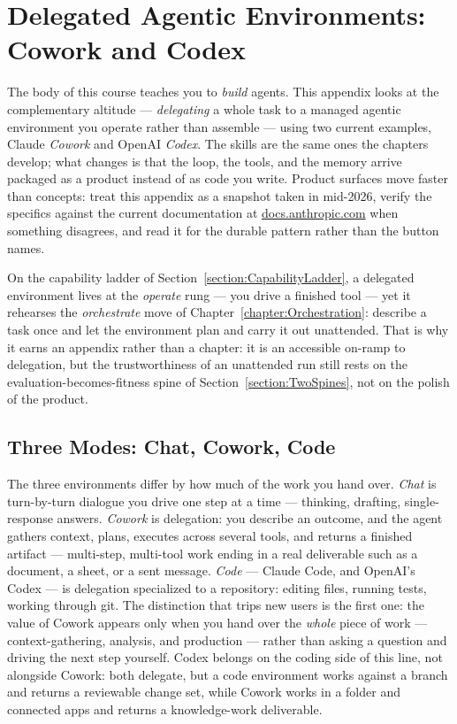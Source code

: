 \chapter{Delegated Agentic Environments: Cowork and Codex}
\label{chapter:CoworkReference}

The body of this course teaches you to \emph{build} agents.
This appendix looks at the complementary altitude --- \emph{delegating} a whole task to a managed agentic environment you operate rather than assemble --- using two current examples, Claude \emph{Cowork} and OpenAI \emph{Codex}.
The skills are the same ones the chapters develop; what changes is that the loop, the tools, and the memory arrive packaged as a product instead of as code you write.
Product surfaces move faster than concepts: treat this appendix as a snapshot taken in mid-2026, verify the specifics against the current documentation at \href{https://docs.anthropic.com}{docs.anthropic.com} when something disagrees, and read it for the durable pattern rather than the button names.

On the capability ladder of Section~\ref{section:CapabilityLadder}, a delegated environment lives at the \emph{operate} rung --- you drive a finished tool --- yet it rehearses the \emph{orchestrate} move of Chapter~\ref{chapter:Orchestration}: describe a task once and let the environment plan and carry it out unattended.
That is why it earns an appendix rather than a chapter: it is an accessible on-ramp to delegation, but the trustworthiness of an unattended run still rests on the evaluation-becomes-fitness spine of Section~\ref{section:TwoSpines}, not on the polish of the product.

\section{Three Modes: Chat, Cowork, Code}

The three environments differ by how much of the work you hand over.
\emph{Chat} is turn-by-turn dialogue you drive one step at a time --- thinking, drafting, single-response answers.
\emph{Cowork} is delegation: you describe an outcome, and the agent gathers context, plans, executes across several tools, and returns a finished artifact --- multi-step, multi-tool work ending in a real deliverable such as a document, a sheet, or a sent message.
\emph{Code} --- Claude Code, and OpenAI's Codex --- is delegation specialized to a repository: editing files, running tests, working through git.
The distinction that trips new users is the first one: the value of Cowork appears only when you hand over the \emph{whole} piece of work --- context-gathering, analysis, and production --- rather than asking a question and driving the next step yourself.
Codex belongs on the coding side of this line, not alongside Cowork: both delegate, but a code environment works against a branch and returns a reviewable change set, while Cowork works in a folder and connected apps and returns a knowledge-work deliverable.

